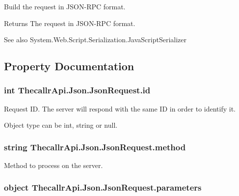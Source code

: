 Build the request in J\+S\+O\+N-\/\+R\+P\+C format. 

\begin{DoxyReturn}{Returns}
The request in J\+S\+O\+N-\/\+R\+P\+C format.
\end{DoxyReturn}
\begin{DoxySeeAlso}{See also}
System.\+Web.\+Script.\+Serialization.\+Java\+Script\+Serializer


\end{DoxySeeAlso}


\subsection{Property Documentation}
\hypertarget{class_thecallr_api_1_1_json_1_1_json_request_a1d4768420076b42a6a32dd793caf6523}{
\subsubsection[{id}]{\setlength{\rightskip}{0pt plus 5cm}int Thecallr\+Api.\+Json.\+Json\+Request.\+id\hspace{0.3cm}{\ttfamily [get]}}}\label{class_thecallr_api_1_1_json_1_1_json_request_a1d4768420076b42a6a32dd793caf6523}


Request I\+D. The server will respond with the same I\+D in order to identify it. 

Object type can be int, string or null.\hypertarget{class_thecallr_api_1_1_json_1_1_json_request_aaab569b47d1872369cf4872fc27a7be8}{
\subsubsection[{method}]{\setlength{\rightskip}{0pt plus 5cm}string Thecallr\+Api.\+Json.\+Json\+Request.\+method\hspace{0.3cm}{\ttfamily [get]}}}\label{class_thecallr_api_1_1_json_1_1_json_request_aaab569b47d1872369cf4872fc27a7be8}


Method to process on the server. 

\hypertarget{class_thecallr_api_1_1_json_1_1_json_request_a90783eb7527497449a7741cb9231acf8}{
\subsubsection[{parameters}]{\setlength{\rightskip}{0pt plus 5cm}object Thecallr\+Api.\+Json.\+Json\+Request.\+parameters\hspace{0.3cm}{\ttfamily [get]}}}\label{class_thecallr_api_1_1_json_1_1_json_request_a90783eb7527497449a7741cb9231acf8}


